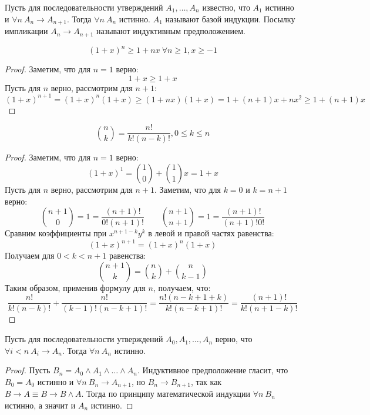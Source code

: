 \documentclass[12pt]{article}
\begin{document}
\begin{axiom}
	Пусть для последовательности утверждений $A_1,\ldots,A_n$ известно,
	что $A_1$ истинно и $\forall n\ A_n\to A_{n+1}$. Тогда $\forall n\
	A_n$ истинно. $A_1$ называют базой индукции. Посылку импликации
	$A_n\to A_{n+1}$ называют индуктивным предположением.
\end{axiom}
\begin{statement}
	\[(1+x)^n\geqslant 1+nx\ \forall n\geqslant 1, x\geqslant -1\]	
	\begin{proof}
		Заметим, что для $n=1$ верно:
		\[1+x\geqslant 1 + x\]		Пусть для $n$ верно, рассмотрим для $n+1$:
		\[(1+x)^{n+1}=(1+x)^n(1+x)\geqslant
		(1+nx)(1+x)=1+(n+1)x+nx^2\geqslant 1+(n+1)x\]	
	\end{proof}
\end{statement}
\begin{theorem}
	\[\binom{n}{k}=\frac{n!}{k!(n-k)!}, 0\leqslant k \leqslant n\]	
	\begin{proof}
		Заметим, что для $n=1$ верно:
		\[(1+x)^1=\binom{1}{0}+\binom{1}{1}x=1+x\]		Пусть для $n$ верно,
		рассмотрим для $n+1$. Заметим, что для $k=0$ и
		$k=n+1$ верно:
		\[\binom{n+1}{0}=1=\frac{(n+1)!}{0!(n+1)!}\qquad
		\binom{n+1}{n+1}=1=\frac{(n+1)!}{(n+1)!0!}\]		Сравним коэффициенты
		при $x^{n+1-k}y^k$ в левой и правой частях равенства:
		\[(1+x)^{n+1}=(1+x)^n(1+x)\]		Получаем для $0<k<n+1$ равенства:
		\begin{equation}
			\tag{2.2}
			\label{Сумма биномиальных коэффициентов}
			\binom{n+1}{k}=\binom{n}{k}+\binom{n}{k-1}
		\end{equation}
		Таким образом, применив формулу для $n$, получаем, что:
		\[\frac{n!}{k!(n-k)!}+\frac{n!}{(k-1)!(n-k+1)!}=\frac{n!(n-k+1+k)}{k!(n-k+1)!}=\frac{(n+1)!}{k!(n+1-k)!}\]	
	\end{proof}
\end{theorem}
\begin{theorem}
	Пусть для последовательности утверждений $A_0,A_1,\ldots,A_n$ верно, что
	$\forall i<n\ A_i\to A_n$. Тогда $\forall n\ A_n$ истинно.
	\begin{proof}
		Пусть $B_n=A_0\land A_1\land \ldots \land A_n$. Индуктивное
		предположение гласит, что $B_0=A_0$ истинно и $\forall n\ B_n\to
		A_{n+1}$, но $B_n\to B_{n+1}$, так как $B\to A \equiv B\to B\land
		A$. Тогда по принципу математической индукции $\forall n\ B_n$
		истинно, а значит и $A_n$ истинно.
	\end{proof}
\end{theorem}
\end{document}

